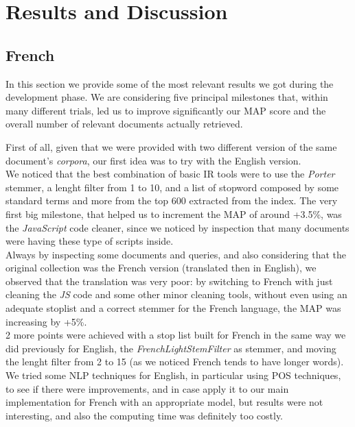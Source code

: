 \pagebreak
\section{Results and Discussion}
\subsection{French}
\label{sec:results}

In this section we provide some of the most relevant results we got during the development phase.
We are considering five principal milestones that, within many different trials, led us to improve significantly our \ac{MAP} score and the overall number of relevant documents actually retrieved.



First of all, given that we were provided with two different version of the same document's \textit{corpora}, our first idea was to try with the English version.\\ 
We noticed that the best combination of basic \ac{IR} tools were to use the \textit{Porter} stemmer, a lenght filter from 1 to 10, and a list of stopword composed by some standard terms and more from the top 600 extracted from the index.
The very first big milestone, that helped us to increment the \ac{MAP} of around +3.5\%, was the \textit{JavaScript} code cleaner, since we noticed by inspection that many documents were having these type of scripts inside.\\
Always by inspecting some documents and queries, and also considering that the original collection was the French version (translated then in English), we observed that the translation was very poor: by switching to French
with just cleaning the \textit{JS} code and some other minor cleaning tools, without even using an adequate stoplist and a correct stemmer for the French language, the \ac{MAP} was increasing by +5\%. \\
2 more points were achieved with a stop list built for French in the same way we did previously for English, the \textit{FrenchLightStemFilter} \cite{solrfrenchlightstemfilter} as stemmer, and moving the lenght filter from 2 to 15 (as we noticed French tends to have longer words). \\
We tried some \ac{NLP} techniques for English, in particular using \ac{POS} techniques, to see if there were improvements, and in case apply it to our main implementation for French with an appropriate model, but results 
were not interesting, and also the computing time was definitely too costly.
